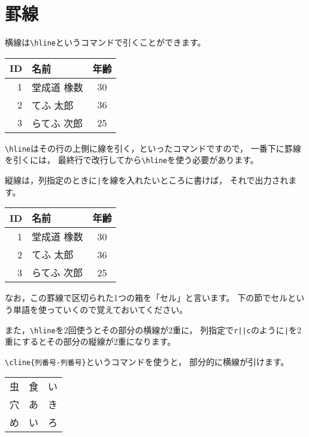 \section{罫線}
横線は\verb|\hline|というコマンドで引くことができます。

\begin{IOTeX}
\begin{tabular}{rlc} \hline
ID & 名前 & 年齢 \\ \hline
1 & 堂成道 橡数 & 30 \\ \hline
2 & てふ 太郎 & 36 \\ \hline
3 & らてふ 次郎 & 25 \\ \hline
\end{tabular}
\end{IOTeX}

\verb|\hline|はその行の上側に線を引く，といったコマンドですので，
一番下に罫線を引くには，
最終行で改行してから\verb|\hline|を使う必要があります。

縦線は，列指定のときに\verb!|!を線を入れたいところに書けば，
それで出力されます。

\begin{IOTeX}
\begin{tabular}{|r|l|c|} \hline
ID & 名前 & 年齢 \\ \hline
1 & 堂成道 橡数 & 30 \\ \hline
2 & てふ 太郎 & 36 \\ \hline
3 & らてふ 次郎 & 25 \\ \hline
\end{tabular}
\end{IOTeX}

なお，この罫線で区切られた1つの箱を「セル」と言います。
下の節でセルという単語を使っていくので覚えておいてください。

また，\verb|\hline|を2回使うとその部分の横線が2重に，
列指定で\verb!r||c!のように\verb!|!を2重にするとその部分の縦線が2重になります。

\verb|\cline{列番号-列番号}|というコマンドを使うと，
部分的に横線が引けます。

\begin{IOTeX}
\begin{tabular}{|ccc|} \hline
虫 & 食 & い \\ \cline{1-2}
穴 & あ & き \\ \cline{2-3}
め & い & ろ \\ \hline
\end{tabular}
\end{IOTeX}

